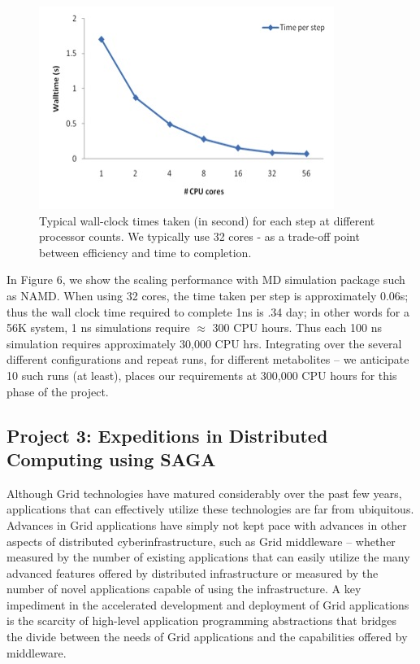 \documentclass[a4paper,10pt]{article}
\begin{document}
\begin{figure}
   \includegraphics[scale=0.660]{56k_scaling-2}
\caption{Typical wall-clock times taken (in second) for each step at different processor counts. We typically use 32 cores - as a trade-off point between efficiency and time to completion. }
\end{figure}

In Figure 6, we show the scaling performance with MD simulation package such as NAMD.  When using 32 cores, the time taken per step is approximately 0.06s; thus the 
wall clock time required to complete 1ns  is .34 day; in other words for a 56K system, 1 ns simulations require $\approx$ 300 CPU hours. Thus each 100 ns simulation requires approximately
30,000 CPU hrs. Integrating over the several different  configurations and repeat runs, for different
metabolites -- we anticipate 10 such runs (at least), places our requirements at 300,000 CPU hours
for this phase of the project. 


\subsection*{Project 3: Expeditions in Distributed Computing using SAGA}

Although Grid technologies have matured considerably over the past few years, applications that can 
effectively utilize these technologies are far from ubiquitous.  Advances in Grid applications have simply 
not kept pace with advances in other aspects of distributed cyberinfrastructure, such as Grid middleware -- 
whether measured by the number of existing applications that can easily utilize the many advanced 
features offered by distributed infrastructure or measured by the number of novel applications capable of 
using the infrastructure. A key impediment in the accelerated development and deployment of Grid 
applications is the scarcity of high-level application programming abstractions that bridges the divide 
between the needs of Grid applications and the capabilities offered by middleware.
\end{document}
